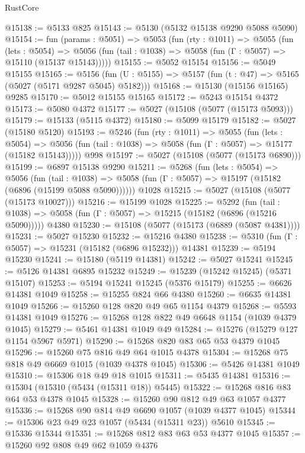 \begin{lexlean}{RustCore}
\begin{coremodule}
@15138 := @5133 @825
@15143 := @5130 (@5132 @15138 @9290 @5088 @5090)
@15154 := fun (params : @5051) =>
  @5053
    (fun (rty : @1011) =>
    @5055
      (fun (lets : @5054) =>
      @5056 (fun (tail : @1038) => @5058 (fun (Γ : @5057) => @15110 (@15137 @15143)))))
@15155 := @5052 @15154
@15156 := @5049 @15155
@15165 := @5156
    (fun (U : @5155) => @5157 (fun (t : @47) => @5165 (@5027 (@5171 @9287 @5045) @5182)))
@15168 := @15130 (@15156 @15165) @9285
@15170 := @5012 @15155 @15165
@15172 := @5243 @15154 @4372
@15173 := @5080 @4372
@15177 := @5027 (@15108 (@5077 (@15173 @5093)))
@15179 := @15133 (@5115 @4372)
@15180 := @5099 @15179
@15182 := @5027 (@15180 @5120)
@15193 := @5246
    (fun (rty : @1011) =>
    @5055
      (fun (lets : @5054) =>
      @5056 (fun (tail : @1038) => @5058 (fun (Γ : @5057) => @15177 (@15182 @15143)))))
    @998
@15197 := @5027 (@15108 (@5077 (@15173 @6890)))
@15199 := @6897 @15138 @9290
@15211 := @5268
    (fun (lets : @5054) =>
    @5056
      (fun (tail : @1038) =>
      @5058 (fun (Γ : @5057) => @15197 (@15182 (@6896 (@15199 @5088 @5090))))))
    @1028
@15215 := @5027 (@15108 (@5077 (@15173 @10027)))
@15216 := @15199 @1028
@15225 := @5292
    (fun (tail : @1038) => @5058 (fun (Γ : @5057) => @15215 (@15182 (@6896 (@15216 @5090)))))
    @4380
@15230 := @15108 (@5077 (@15173 (@6889 (@5087 @4381))))
@15231 := @5027 @15230
@15232 := @15216 @4380
@15238 := @5310 (fun (Γ : @5057) => @15231 (@15182 (@6896 @15232))) @14381
@15239 := @5194 @15230
@15241 := @15180 (@5119 @14381)
@15242 := @5027 @15241
@15245 := @5126 @14381 @6895 @15232
@15249 := @15239 (@15242 @15245) (@5371 @15107)
@15253 := @5194 @15241 @15245 (@5376 @15179)
@15255 := @6626 @14381 @1049
@15258 := @15255 @824 @66 @4380
@15260 := @6635 @14381 @1049
@15266 := @15260 @128 @820 @49 @65 @1154 @4379
@15268 := @5593 @14381 @1049
@15276 := @15268 @128 @822 @49 @6648 @1154 (@1039 @4379 @1045)
@15279 := @5461 @14381 @1049 @49
@15284 := @15276 (@15279 @127 @1154 @5967 @5971)
@15290 := @15268 @820 @83 @65 @53 @4379 @1045
@15296 := @15260 @75 @816 @49 @64 @1015 @4378
@15304 := @15268 @75 @818 @49 @6669 @1015 (@1039 @4378 @1045)
@15306 := @5426 @14381 @1049
@15310 := @15306 @18 @49 @18 @1015
@15311 := @5435 @14381
@15316 := @15304 (@15310 (@5434 (@15311 @18)) @5445)
@15322 := @15268 @816 @83 @64 @53 @4378 @1045
@15328 := @15260 @90 @812 @49 @63 @1057 @4377
@15336 := @15268 @90 @814 @49 @6690 @1057 (@1039 @4377 @1045)
@15344 := @15306 @23 @49 @23 @1057 (@5434 (@15311 @23)) @5610
@15345 := @15336 @15344
@15351 := @15268 @812 @83 @63 @53 @4377 @1045
@15357 := @15260 @92 @808 @49 @62 @1059 @4376

\end{coremodule}
\end{lexlean}
